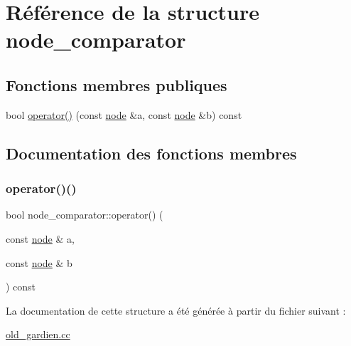 \hypertarget{structnode__comparator}{}\section{Référence de la structure node\+\_\+comparator}
\label{structnode__comparator}
\subsection*{Fonctions membres publiques}
\begin{DoxyCompactItemize}
\item 
bool \hyperlink{structnode__comparator_a66452bb9395d8d2da7b07408aa5b81bb}{operator()} (const \hyperlink{structnode}{node} \&a, const \hyperlink{structnode}{node} \&b) const
\end{DoxyCompactItemize}


\subsection{Documentation des fonctions membres}
\mbox{\label{structnode__comparator_a66452bb9395d8d2da7b07408aa5b81bb}} 
\subsubsection{\texorpdfstring{operator()()}{operator()()}}
{\footnotesize\ttfamily bool node\+\_\+comparator\+::operator() (\begin{DoxyParamCaption}\item[{const \hyperlink{structnode}{node} \&}]{a,  }\item[{const \hyperlink{structnode}{node} \&}]{b }\end{DoxyParamCaption}) const\hspace{0.3cm}{\ttfamily [inline]}}



La documentation de cette structure a été générée à partir du fichier suivant \+:\begin{DoxyCompactItemize}
\item 
\hyperlink{old__gardien_8cc}{old\+\_\+gardien.\+cc}\end{DoxyCompactItemize}
